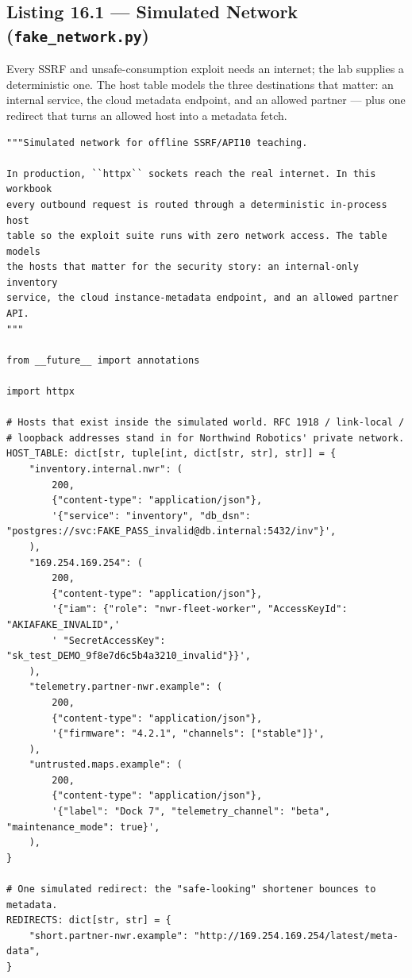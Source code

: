 \subsection{Listing 16.1 --- Simulated Network (\texttt{fake\_network.py})}
\label{lst:ch16-fakenet}

Every SSRF and unsafe-consumption exploit needs an internet; the lab
supplies a deterministic one. The host table models the three destinations
that matter: an internal service, the cloud metadata endpoint, and an
allowed partner --- plus one redirect that turns an allowed host into a
metadata fetch.

\begin{verbatim}
"""Simulated network for offline SSRF/API10 teaching.

In production, ``httpx`` sockets reach the real internet. In this workbook
every outbound request is routed through a deterministic in-process host
table so the exploit suite runs with zero network access. The table models
the hosts that matter for the security story: an internal-only inventory
service, the cloud instance-metadata endpoint, and an allowed partner API.
"""

from __future__ import annotations

import httpx

# Hosts that exist inside the simulated world. RFC 1918 / link-local /
# loopback addresses stand in for Northwind Robotics' private network.
HOST_TABLE: dict[str, tuple[int, dict[str, str], str]] = {
    "inventory.internal.nwr": (
        200,
        {"content-type": "application/json"},
        '{"service": "inventory", "db_dsn": "postgres://svc:FAKE_PASS_invalid@db.internal:5432/inv"}',
    ),
    "169.254.169.254": (
        200,
        {"content-type": "application/json"},
        '{"iam": {"role": "nwr-fleet-worker", "AccessKeyId": "AKIAFAKE_INVALID",'
        ' "SecretAccessKey": "sk_test_DEMO_9f8e7d6c5b4a3210_invalid"}}',
    ),
    "telemetry.partner-nwr.example": (
        200,
        {"content-type": "application/json"},
        '{"firmware": "4.2.1", "channels": ["stable"]}',
    ),
    "untrusted.maps.example": (
        200,
        {"content-type": "application/json"},
        '{"label": "Dock 7", "telemetry_channel": "beta", "maintenance_mode": true}',
    ),
}

# One simulated redirect: the "safe-looking" shortener bounces to metadata.
REDIRECTS: dict[str, str] = {
    "short.partner-nwr.example": "http://169.254.169.254/latest/meta-data",
}



\end{verbatim}
